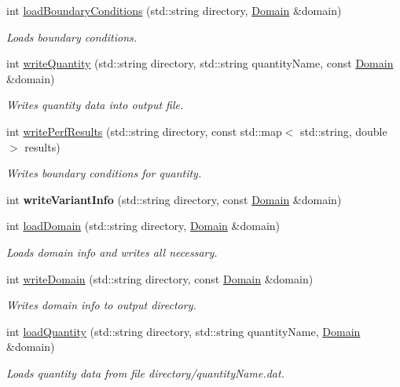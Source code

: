 \begin{DoxyCompactItemize}
int \hyperlink{namespaceIO_a7710f22e4bbbd375162154b69289e5e0}{load\+Boundary\+Conditions} (std\+::string directory, \hyperlink{classDomain}{Domain} \&domain)
\begin{DoxyCompactList}\small\item\em Loads boundary conditions. \end{DoxyCompactList}\item 
int \hyperlink{namespaceIO_a98f43edfc02e8c62ca9f005a9994ab69}{write\+Quantity} (std\+::string directory, std\+::string quantity\+Name, const \hyperlink{classDomain}{Domain} \&domain)
\begin{DoxyCompactList}\small\item\em Writes quantity data into output file. \end{DoxyCompactList}\item 
int \hyperlink{namespaceIO_a3d084b6a7dd69ca5da733e0602df5f8d}{write\+Perf\+Results} (std\+::string directory, const std\+::map$<$ std\+::string, double $>$ results)
\begin{DoxyCompactList}\small\item\em Writes boundary conditions for quantity. \end{DoxyCompactList}\item 
\mbox{\label{namespaceIO_a9388e688bab072c402da7a19e5527ead}} 
int {\bfseries write\+Variant\+Info} (std\+::string directory, const \hyperlink{classDomain}{Domain} \&domain)
\item 
int \hyperlink{namespaceIO_a418e0be241e707d7d99718c3a1dacf6b}{load\+Domain} (std\+::string directory, \hyperlink{classDomain}{Domain} \&domain)
\begin{DoxyCompactList}\small\item\em Loads domain info and writes all necessary. \end{DoxyCompactList}\item 
int \hyperlink{namespaceIO_a63332902621fd10f3117978585af8a27}{write\+Domain} (std\+::string directory, const \hyperlink{classDomain}{Domain} \&domain)
\begin{DoxyCompactList}\small\item\em Writes domain info to output directory. \end{DoxyCompactList}\item 
int \hyperlink{namespaceIO_a0b5a994855e5e391320a431095d66400}{load\+Quantity} (std\+::string directory, std\+::string quantity\+Name, \hyperlink{classDomain}{Domain} \&domain)
\begin{DoxyCompactList}\small\item\em Loads quantity data from file directory/quantity\+Name.\+dat. \end{DoxyCompactList}\item 

\end{DoxyCompactItemize}

